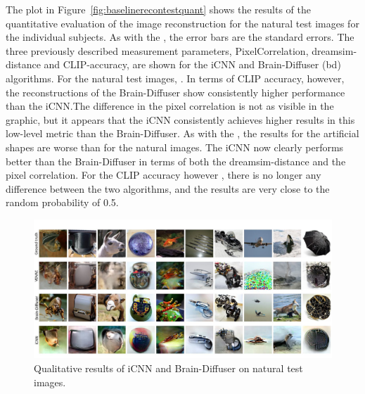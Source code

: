 The plot in Figure~\ref{fig:baselinerecontestquant} shows the results of the quantitative evaluation of the image reconstruction for the natural test images for the individual subjects. As with the , the error bars are the standard errors. The three previously described measurement parameters, PixelCorrelation, dreamsim-distance and CLIP-accuracy, are shown for the iCNN and Brain-Diffuser (bd) algorithms. For the natural test images, . In terms of CLIP accuracy, however, the reconstructions of the Brain-Diffuser show consistently higher performance than the iCNN.\@ The difference in the pixel correlation is not as visible in the graphic, but it appears that the iCNN consistently achieves higher results in this low-level metric than the Brain-Diffuser.  As with the , the results for the artificial shapes are  worse than for the natural images. The iCNN now clearly performs better than the Brain-Diffuser in terms of both the dreamsim-distance and the pixel correlation. For the CLIP accuracy however , there is no longer any  difference between the two algorithms, and the results are very close to the random probability of 0.5. 


\begin{figure}[ht]
    \centering
    \includegraphics[width=1\textwidth]{plots/baseline_qual_recon_test.JPEG}
    \caption[Reconstructed images for iCNN and Brain-Diffuser on natural test images]{Qualitative results of iCNN and Brain-Diffuser on natural test images. }\label{fig:baselinerecontestqual}
\end{figure}

